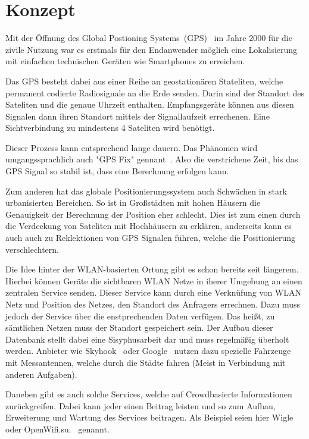 \documentclass[11pt,a4paper]{article}
\begin{document}
\section{Konzept}

Mit der Öffnung des Global Postioning Systems~(GPS)~\cite{gps} im Jahre 2000 für die zivile Nutzung war es erstmals für den Endanwender möglich eine Lokalisierung mit einfachen technischen Geräten wie Smartphones zu erreichen.

Das GPS besteht dabei aus einer Reihe an geostationären Stateliten, welche permanent codierte Radiosignale an die Erde senden. Darin sind der Standort des Sateliten und die genaue Uhrzeit enthalten. Empfangsgeräte können aus diesen Signalen dann ihren Standort mittels der Signallaufzeit errechenen. Eine Sichtverbindung zu mindestens 4 Sateliten wird benötigt.

Dieser Prozess kann entsprechend lange dauern. Das Phänomen wird umgangssprachlich auch "GPS Fix" gennant~\cite{gpsfix}. Also die verstrichene Zeit, bis das GPS Signal so stabil ist, dass eine Berechnung erfolgen kann. 

Zum anderen hat das globale Positionierungssystem auch Schwächen in stark urbanisierten Bereichen. So ist in Großstädten mit hohen Häusern die Genauigkeit der Berechnung der Position eher schlecht. Dies ist zum einen durch die Verdeckung von Sateliten mit Hochhäusern zu erklären, anderseits kann es auch auch zu Reklektionen von GPS Signalen führen, welche die Positionierung verschlechtern.

Die Idee hinter der WLAN-basierten Ortung gibt es schon bereits seit längerem. Hierbei können Geräte die sichtbaren WLAN Netze in iherer Umgebung an einen zentralen Service senden. Dieser Service kann durch eine Verknüfung von WLAN Netz und Position des Netzes, den Standort des Anfragers errechnen. Dazu muss jedoch der Service über die enstprechenden Daten verfügen. Das heißt, zu sämtlichen Netzen muss der Standort gespeichert sein. Der Aufbau dieser Datenbank stellt dabei eine Sisyphusarbeit dar und muss regelmäßig überholt werden. Anbieter wie Skyhook~\cite{skyhook} oder Google~\cite{google_pos} nutzen dazu spezielle Fahrzeuge mit Messantennen, welche durch die Städte fahren (Meist in Verbindung mit anderen Aufgaben). 

Daneben gibt es auch solche Services, welche auf Crowdbasierte Informationen zurückgreifen. Dabei kann jeder einen Beitrag leisten und so zum Aufbau, Erweiterung und Wartung des Services beitragen. Als Beispiel seien hier Wigle~\cite{wigle} oder OpenWifi.su.~\cite{openwifi} genannt.
\end{document}
